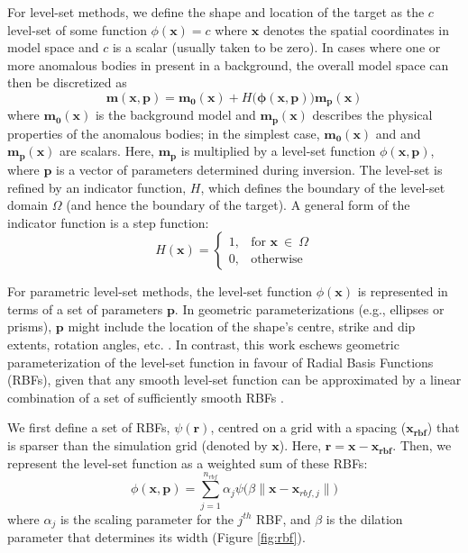 \documentclass{segabs}
\begin{document}
For level-set methods, we define the shape and location of the target as the $c$ level-set of some function ${\phi(\mathbf{x})} = c$ where $\mathbf{x}$ denotes the spatial coordinates in model space and $c$ is a scalar (usually taken to be zero). In cases where one or more anomalous bodies in present in a background, the overall model space can then be discretized as
 \begin{equation}\label{model_eq}
\mathbf{m(x, p)} = \mathbf{m_0(x)} + H\big(\mathbf{\phi(x,p)}\big)\mathbf{m_p(x)}
\end{equation}
where $\mathbf{m_0(x)}$ is the background model and $\mathbf{m_p(x)}$ describes the physical properties of the anomalous bodies; in the simplest case, $\mathbf{m_0(x)}$ and and $\mathbf{m_p(x)}$ are scalars. Here, $\mathbf{m_p}$ is multiplied by a level-set function $\phi(\mathbf{x},\mathbf{p})$, where $\mathbf{p}$ is a vector of parameters determined during inversion. The level-set is refined by an indicator function, $H$, which defines the boundary of the level-set domain $\Omega$ (and hence the boundary of the target). A general form of the indicator function is a step function:
$$H(\mathbf{x}) = \begin{cases}
	1, & \text{for } \mathbf{x} \ \in \  \Omega\\
	0, & \text{otherwise}
\end{cases}$$

For parametric level-set methods, the level-set function $\phi(\mathbf{x})$ is represented in terms of a set of parameters $\mathbf{p}$. In geometric parameterizations (e.g., ellipses or prisms), $\mathbf{p}$ might include the location of the shape’s centre, strike and dip extents, rotation angles, etc. \citep{belliveau_parametric_2023}. In contrast, this work eschews geometric parameterization of the level-set function in favour of Radial Basis Functions (RBFs), given that any smooth level-set function can be approximated by a linear combination of a set of sufficiently smooth RBFs \citep{aghasi_parametric_2011}.

We first define a set of RBFs, $\psi(\mathbf{r})$, centred on a grid with a spacing ($\mathbf{x_{rbf}}$) that is sparser than the simulation grid (denoted by $\mathbf{x}$). Here, $\mathbf{r} = \mathbf{x} - \mathbf{x_{rbf}}$. Then, we represent the level-set function as a weighted sum of these RBFs:
\begin{equation}\label{rbf_param}
\phi(\mathbf{x},\mathbf{p}) = \sum_{j=1}^{n_{rbf}} \alpha_j  \psi\Big(\beta \| \mathbf{x} - \mathbf{x}_{rbf,j}\|\Big)\end{equation}
where $\alpha_j$ is the scaling parameter for the $j^{th}$ RBF, and $\beta$ is the dilation parameter that determines its width (Figure \ref{fig:rbf}).
\end{document}
